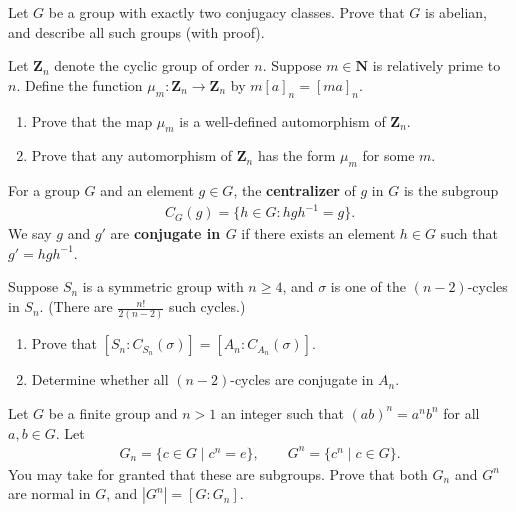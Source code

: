 \documentclass[11pt,twoside,openany]{memoir}
\begin{document}
        \begin{exercise}
        Let $G$ be a group with exactly two conjugacy classes. Prove that $G$ is abelian, and describe all such groups (with proof).
        \end{exercise}
        
        \begin{exercise}
        Let $\mathbf{Z}_n$ denote the cyclic group of order $n$. Suppose $m\in \mathbf{N}$ is relatively prime to $n$. Define the function $\mu_m:\mathbf{Z}_n\to \mathbf{Z}_n$ by $m[a]_n=[ma]_n$.
        \begin{enumerate}[label = (\arabic*)]
            \item Prove that the map $\mu_m$ is a well-defined automorphism of $\mathbf{Z}_n$.
            \item Prove that any automorphism of $\mathbf{Z}_n$ has the form $\mu_m$ for some $m$.
        \end{enumerate}
        \end{exercise}
        
        \begin{exercise}
        For a group $G$ and an element $g\in G$, the \textbf{centralizer} of $g$ in $G$ is the subgroup
        \begin{equation*}
        \begin{split}
        C_G(g)=\{h\in G:hgh^{-1}=g\}.
        \end{split}
        \end{equation*}
        We say $g$ and $g'$ are \textbf{conjugate in $G$} if there exists an element $h\in G$ such that $g'=hgh^{-1}$.
        
        Suppose $S_n$ is a symmetric group with $n\ge 4$, and $\sigma$ is one of the $(n-2)$-cycles in $S_n$. (There are $\frac{n!}{2(n-2)}$ such cycles.)
        \begin{enumerate}[label = (\arabic*)]
            \item Prove that $[S_n:C_{S_n}(\sigma)]=[A_n:C_{A_n}(\sigma)]$.
            \item Determine whether all $(n-2)$-cycles are conjugate in $A_n$.
        \end{enumerate}
        \end{exercise}
        
        \begin{exercise}
        Let $G$ be a finite group and $n>1$ an integer such that $(ab)^n=a^n b^n$ for all $a,b\in G$. Let
        \begin{equation*}
        \begin{split}
        G_n=\{c\in G\mid c^n=e\},\qquad G^n=\{c^n\mid c\in G\}.
        \end{split}
        \end{equation*}
        You may take for granted that these are subgroups. Prove that both $G_n$ and $G^n$ are normal in $G$, and $|G^n|=[G:G_n]$.
        \end{exercise}
        
\end{document}
